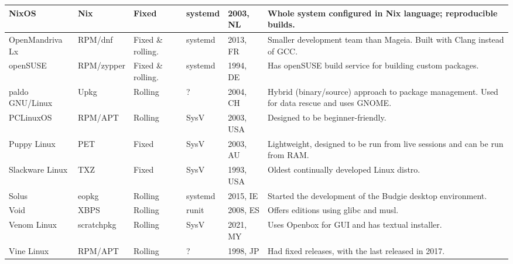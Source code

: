 \documentclass[12pt,a4paper]{article}
\begin{document}
\begin{landscape}
\begin{table}
\begin{tabular}{|p{3.5cm}|p{2.3cm}|p{1.6cm}|p{2.3cm}|p{1.9cm}|p{14.8cm}|}
			NixOS & Nix & Fixed & systemd & 2003, NL & Whole system configured in Nix language; reproducible builds. \\\hline
			OpenMandriva Lx & RPM/dnf & Fixed \& rolling. & systemd & 2013, FR & Smaller development team than Mageia. Built with Clang instead of GCC. \\\hline
			openSUSE & RPM/zypper & Fixed \& rolling. & systemd & 1994, DE & Has openSUSE build service for building custom packages. \\\hline
			paldo GNU/Linux & Upkg & Rolling & ? & 2004, CH & Hybrid (binary/source) approach to package management. Used for data rescue and uses GNOME. \\\hline
			PCLinuxOS & RPM/APT & Rolling & SysV & 2003, USA & Designed to be beginner-friendly. \\\hline
			Puppy Linux & PET & Fixed & SysV & 2003, AU & Lightweight, designed to be run from live sessions and can be run from RAM. \\\hline
			Slackware Linux & TXZ & Fixed & SysV & 1993, USA & Oldest continually developed Linux distro. \\\hline
			Solus & eopkg & Rolling & systemd & 2015, IE & Started the development of the Budgie desktop environment. \\\hline
			Void & XBPS & Rolling & runit & 2008, ES & Offers editions using glibc and musl. \\\hline
			Venom Linux & scratchpkg & Rolling & SysV & 2021, MY & Uses Openbox for GUI and has textual installer. \\\hline
			Vine Linux & RPM/APT & Rolling & ? & 1998, JP & Had fixed releases, with the last released in 2017. \\\hline
		\end{tabular}
	\end{table}
	\end{landscape}
	
\end{document}

